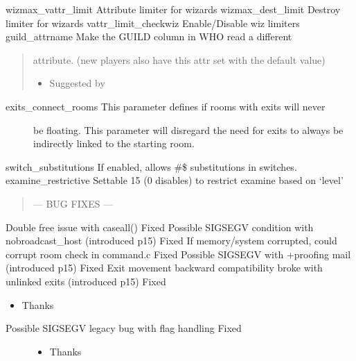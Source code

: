 \documentclass[letterpaper,10pt,english]{sphinxmanual}
\begin{document}
\sphinxAtStartPar
wizmax\_vattr\_limit   \sphinxhyphen{} Attribute limiter for wizards
wizmax\_dest\_limit    \sphinxhyphen{} Destroy limiter for wizards
vattr\_limit\_checkwiz \sphinxhyphen{} Enable/Disable wiz limiters
guild\_attrname       \sphinxhyphen{} Make the GUILD column in WHO read a different
\begin{quote}

\sphinxAtStartPar
attribute. (new players also have this attr
set with the default value)
\begin{itemize}
\item {} 
\sphinxAtStartPar
Suggested by 

\end{itemize}
\end{quote}
\begin{description}
\item[{exits\_connect\_rooms  \sphinxhyphen{} This parameter defines if rooms with exits will never}] \leavevmode
\sphinxAtStartPar
be floating.  This parameter will disregard the need
for exits to always be indirectly linked to the
starting room.

\end{description}

\sphinxAtStartPar
switch\_substitutions \sphinxhyphen{} If enabled, allows \#\$ substitutions in switches.
examine\_restrictive  \sphinxhyphen{} Settable 1\sphinxhyphen{}5 (0 disables) to restrict examine based on ‘level’
\begin{quote}

\sphinxAtStartPar
— BUG FIXES —
\end{quote}

\sphinxAtStartPar
Double free issue with caseall() \sphinxhyphen{} Fixed
Possible SIGSEGV condition with nobroadcast\_host (introduced p15)  \sphinxhyphen{} Fixed
If memory/system corrupted, could corrupt room check in command.c \sphinxhyphen{} Fixed
Possible SIGSEGV with +proofing mail (introduced p15) \sphinxhyphen{} Fixed
Exit movement backward compatibility broke with unlinked exits (introduced p15) \sphinxhyphen{} Fixed
\begin{itemize}
\item {} 
\sphinxAtStartPar
Thanks 

\end{itemize}
\begin{description}
\item[{Possible SIGSEGV legacy bug with flag handling \sphinxhyphen{} Fixed}] \leavevmode\begin{itemize}
\item {} 
\sphinxAtStartPar
Thanks 

\end{itemize}

\end{description}
\end{document}
